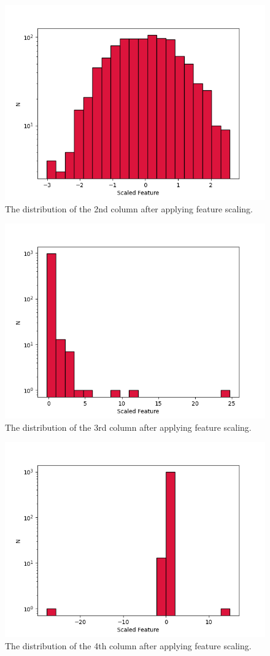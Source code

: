 \documentclass[a4paper,10pt]{article}
\begin{document}
\begin{figure}[H]
  \centering
  \includegraphics[width=.7\linewidth]{./plots/distr_1.png}
  \caption{The distribution of the 2nd column after applying feature scaling.}
  \label{fig:distr_2}
\end{figure}

\begin{figure}[H]
  \centering
  \includegraphics[width=.7\linewidth]{./plots/distr_2.png}
  \caption{The distribution of the 3rd column after applying feature scaling.}
  \label{fig:distr_3}
\end{figure}

\begin{figure}[H]
  \centering
  \includegraphics[width=.7\linewidth]{./plots/distr_3.png}
  \caption{The distribution of the 4th column after applying feature scaling.}
  \label{fig:distr_4}
\end{figure}
\end{document}
